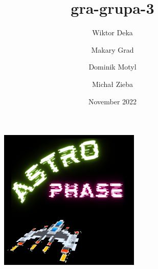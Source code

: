 \documentclass{article}
\title{gra-grupa-3}
\author{Wiktor Deka \and Makary Grad \and Dominik Motyl \and Michał Zieba}
\date{November 2022}
\begin{document}
\maketitle
\begin{figure}[htbp]
    \centering
    \includegraphics[width=0.6\textwidth]{pictures/AstroPhase.png}
\end{figure}





\end{document}
